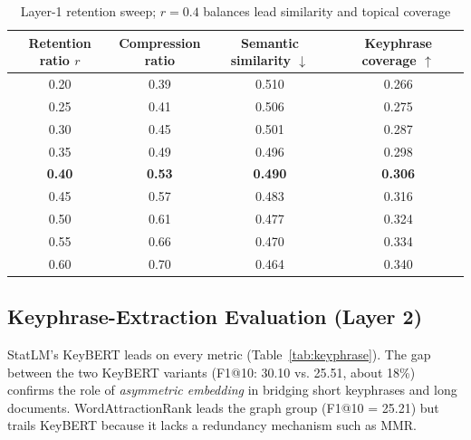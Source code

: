 \begin{table}[!t]
\renewcommand{\arraystretch}{1.2}
\caption{Layer-1 retention sweep; $r{=}0.4$ balances lead similarity and topical coverage}
\label{tab:retention}
\centering
\footnotesize
\begin{tabular*}{\columnwidth}{@{\extracolsep{\fill}}cccc@{}}
\toprule
\shortstack{Retention\\ratio $r$} & \shortstack{Compression\\ratio}
 & \shortstack{Semantic\\similarity $\downarrow$}
 & \shortstack{Keyphrase\\coverage $\uparrow$} \\
\midrule
0.20 & 0.39 & 0.510 & 0.266 \\
0.25 & 0.41 & 0.506 & 0.275 \\
0.30 & 0.45 & 0.501 & 0.287 \\
0.35 & 0.49 & 0.496 & 0.298 \\
\textbf{0.40} & \textbf{0.53} & \textbf{0.490} & \textbf{0.306} \\
0.45 & 0.57 & 0.483 & 0.316 \\
0.50 & 0.61 & 0.477 & 0.324 \\
0.55 & 0.66 & 0.470 & 0.334 \\
0.60 & 0.70 & 0.464 & 0.340 \\
\bottomrule
\end{tabular*}
\end{table}


\subsection{Keyphrase-Extraction Evaluation (Layer 2)}
StatLM's KeyBERT leads on every metric (Table~\ref{tab:keyphrase}). The gap between the two KeyBERT variants (F1@10: 30.10 vs. 25.51, about 18\%) confirms the role of \emph{asymmetric embedding} in bridging short keyphrases and long documents. WordAttractionRank leads the graph group (F1@10 = 25.21) but trails KeyBERT because it lacks a redundancy mechanism such as MMR.

